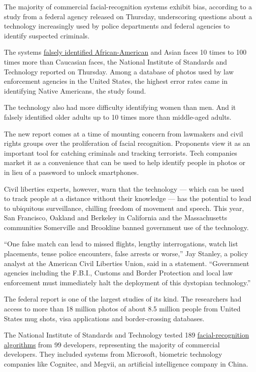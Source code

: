 The majority of commercial facial-recognition systems exhibit bias,
according to a study from a federal agency released on Thursday,
underscoring questions about a technology increasingly used by police
departments and federal agencies to identify suspected criminals.

The systems
\href{https://www.nytimes.com/2019/07/08/us/detroit-facial-recognition-cameras.html}{falsely
identified African-American} and Asian faces 10 times to 100 times more
than Caucasian faces, the National Institute of Standards and Technology
reported on Thursday. Among a database of photos used by law enforcement
agencies in the United States, the highest error rates came in
identifying Native Americans, the study found.

The technology also had more difficulty identifying women than men. And
it falsely identified older adults up to 10 times more than middle-aged
adults.

The new report comes at a time of mounting concern from lawmakers and
civil rights groups over the proliferation of facial recognition.
Proponents view it as an important tool for catching criminals and
tracking terrorists. Tech companies market it as a convenience that can
be used to help identify people in photos or in lieu of a password to
unlock smartphones.

Civil liberties experts, however, warn that the technology --- which can
be used to track people at a distance without their knowledge --- has
the potential to lead to ubiquitous surveillance, chilling freedom of
movement and speech. This year, San Francisco, Oakland and Berkeley in
California and the Massachusetts communities Somerville and Brookline
banned government use of the technology.

``One false match can lead to missed flights, lengthy interrogations,
watch list placements, tense police encounters, false arrests or
worse,'' Jay Stanley, a policy analyst at the American Civil Liberties
Union, said in a statement. ``Government agencies including the F.B.I.,
Customs and Border Protection and local law enforcement must immediately
halt the deployment of this dystopian technology.''

The federal report is one of the largest studies of its kind. The
researchers had access to more than 18 million photos of about 8.5
million people from United States mug shots, visa applications and
border-crossing databases.

The National Institute of Standards and Technology tested 189
\href{https://www.nytimes.com/2019/01/24/technology/amazon-facial-technology-study.html}{facial-recognition
algorithms} from 99 developers, representing the majority of commercial
developers. They included systems from Microsoft, biometric technology
companies like Cognitec, and Megvii, an artificial intelligence company
in China.

